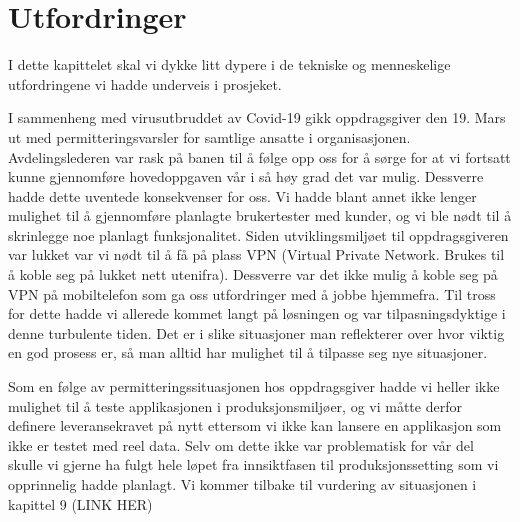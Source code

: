 \chapter{\textbf{Utfordringer}}
 I dette kapittelet skal vi dykke litt dypere i de tekniske og menneskelige utfordringene vi hadde underveis i prosjeket.

I sammenheng med virusutbruddet av Covid-19 gikk oppdragsgiver den 19. Mars ut med permitteringsvarsler for samtlige ansatte i organisasjonen. Avdelingslederen var rask på banen til å følge opp oss for å sørge for at vi fortsatt kunne gjennomføre hovedoppgaven vår i så høy grad det var mulig. Dessverre hadde dette uventede konsekvenser for oss. Vi hadde blant annet ikke lenger mulighet til å gjennomføre planlagte brukertester med kunder, og vi ble nødt til å skrinlegge noe planlagt funksjonalitet. Siden utviklingsmiljøet til oppdragsgiveren var lukket var vi nødt til å få på plass VPN (Virtual Private Network. Brukes til å koble seg på lukket nett utenifra). Dessverre var det ikke mulig å koble seg på VPN på mobiltelefon som ga oss utfordringer med å jobbe hjemmefra. Til tross for dette hadde vi allerede kommet langt på løsningen og var tilpasningsdyktige i denne turbulente tiden. Det er i slike situasjoner man reflekterer over hvor viktig en god prosess er, så man alltid har mulighet til å tilpasse seg nye situasjoner.

Som en følge av permitteringssituasjonen hos oppdragsgiver hadde vi heller ikke mulighet til å teste applikasjonen i produksjonsmiljøer, og vi måtte derfor definere leveransekravet på nytt ettersom vi ikke kan lansere en applikasjon som ikke er testet med reel data. Selv om dette ikke var problematisk for vår del skulle vi gjerne ha fulgt hele løpet fra innsiktfasen til produksjonssetting som vi opprinnelig hadde planlagt. Vi kommer tilbake til vurdering av situasjonen i kapittel 9 (LINK HER)
